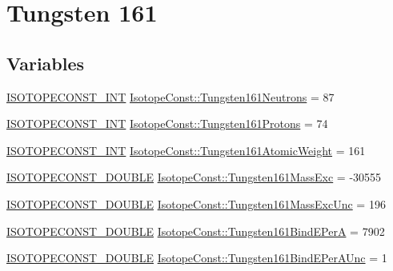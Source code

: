 \hypertarget{group___isotope_const-_tungsten-_w161}{}\section{Tungsten 161}
\label{group___isotope_const-_tungsten-_w161}
\subsection*{Variables}
\begin{DoxyCompactItemize}
\item 
\mbox{\hyperlink{group___isotope_const-_macros_ga5f18360b3e99483a35c32d789e62621c}{I\+S\+O\+T\+O\+P\+E\+C\+O\+N\+S\+T\+\_\+\+I\+NT}} \mbox{\hyperlink{group___isotope_const-_tungsten-_w161_ga6b034f75e57adb95397b8a113505675b}{Isotope\+Const\+::\+Tungsten161\+Neutrons}} = 87
\item 
\mbox{\hyperlink{group___isotope_const-_macros_ga5f18360b3e99483a35c32d789e62621c}{I\+S\+O\+T\+O\+P\+E\+C\+O\+N\+S\+T\+\_\+\+I\+NT}} \mbox{\hyperlink{group___isotope_const-_tungsten-_w161_ga1a1dd4bf42b481b0885a54a04e6d4ff2}{Isotope\+Const\+::\+Tungsten161\+Protons}} = 74
\item 
\mbox{\hyperlink{group___isotope_const-_macros_ga5f18360b3e99483a35c32d789e62621c}{I\+S\+O\+T\+O\+P\+E\+C\+O\+N\+S\+T\+\_\+\+I\+NT}} \mbox{\hyperlink{group___isotope_const-_tungsten-_w161_gac336c7fbfabd6cc92a2d53c7647ab65a}{Isotope\+Const\+::\+Tungsten161\+Atomic\+Weight}} = 161
\item 
\mbox{\hyperlink{group___isotope_const-_macros_ga8f45a7272ce02c0b4c65c44636ed719a}{I\+S\+O\+T\+O\+P\+E\+C\+O\+N\+S\+T\+\_\+\+D\+O\+U\+B\+LE}} \mbox{\hyperlink{group___isotope_const-_tungsten-_w161_ga23031469e6981582ea2af7603250046e}{Isotope\+Const\+::\+Tungsten161\+Mass\+Exc}} = -\/30555
\item 
\mbox{\hyperlink{group___isotope_const-_macros_ga8f45a7272ce02c0b4c65c44636ed719a}{I\+S\+O\+T\+O\+P\+E\+C\+O\+N\+S\+T\+\_\+\+D\+O\+U\+B\+LE}} \mbox{\hyperlink{group___isotope_const-_tungsten-_w161_gaf7e655c7e2b14ff0e20d281bb29c313f}{Isotope\+Const\+::\+Tungsten161\+Mass\+Exc\+Unc}} = 196
\item 
\mbox{\hyperlink{group___isotope_const-_macros_ga8f45a7272ce02c0b4c65c44636ed719a}{I\+S\+O\+T\+O\+P\+E\+C\+O\+N\+S\+T\+\_\+\+D\+O\+U\+B\+LE}} \mbox{\hyperlink{group___isotope_const-_tungsten-_w161_ga622931cec2f4be9ebc50cacec7bf9ce6}{Isotope\+Const\+::\+Tungsten161\+Bind\+E\+PerA}} = 7902
\item 
\mbox{\hyperlink{group___isotope_const-_macros_ga8f45a7272ce02c0b4c65c44636ed719a}{I\+S\+O\+T\+O\+P\+E\+C\+O\+N\+S\+T\+\_\+\+D\+O\+U\+B\+LE}} \mbox{\hyperlink{group___isotope_const-_tungsten-_w161_ga7a1b842688bc9ffb0651bce275bd2eed}{Isotope\+Const\+::\+Tungsten161\+Bind\+E\+Per\+A\+Unc}} = 1

\end{DoxyCompactItemize}
